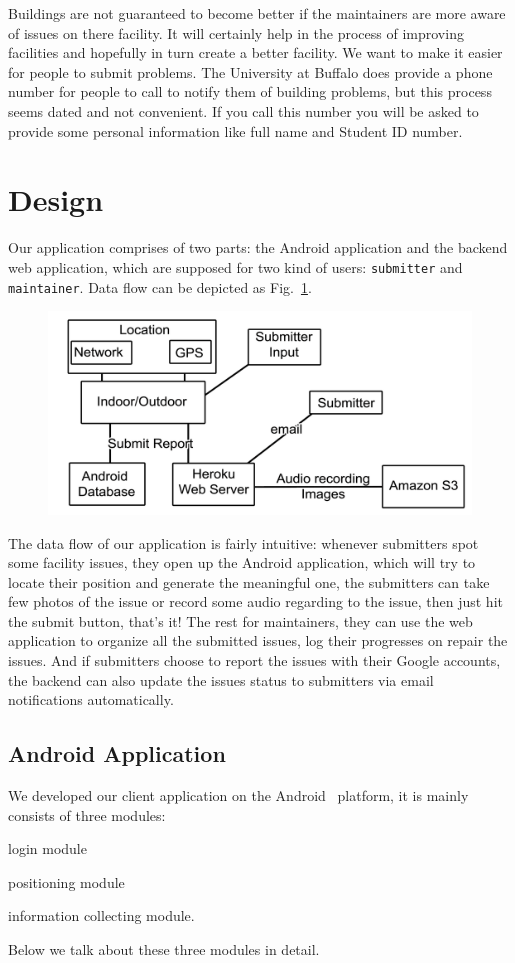 \documentclass{acm_proc_article-sp}
\begin{document}
Buildings are not guaranteed to become better if the maintainers are more aware of issues on there facility. It will certainly help in the process of improving 
facilities and hopefully in turn create a better facility. We want to make it easier for people to submit problems. The University at Buffalo does provide a phone
number for people to call to notify them of building problems, but this process seems dated and not convenient. If you call this number you will be asked to provide
some personal information like full name and Student ID number.

\section{Design}
Our application comprises of two parts: the Android application and the backend web application, which are supposed for two kind of users:
\texttt{submitter} and \texttt{maintainer}. Data flow can be depicted as Fig.~\ref{fig:diagram}.
\begin{figure}
\centering
\includegraphics[scale=0.1]{images/diagram.png}
\caption{}\label{fig:diagram}
\end{figure}
The data flow of our application is fairly intuitive: whenever submitters spot some facility issues, they open up the Android application, which will
try to locate their position and generate the meaningful one, the submitters can take few photos of the issue or record some audio regarding to
the issue, then just hit the submit button, that's it! The rest for maintainers, they can use the web application to organize all the submitted issues,
log their progresses on repair the issues. And if submitters choose to report the issues with their Google accounts, the backend can also update
the issues status to submitters via email notifications automatically.

\subsection{Android Application}
We developed our client application on the Android~\cite{android} platform,
it is mainly consists of three modules:
\begin{inparaenum}
 \item login module
 \item positioning module
 \item information collecting module.
 \end{inparaenum}
 Below we talk about these three modules in detail.
\end{document}
